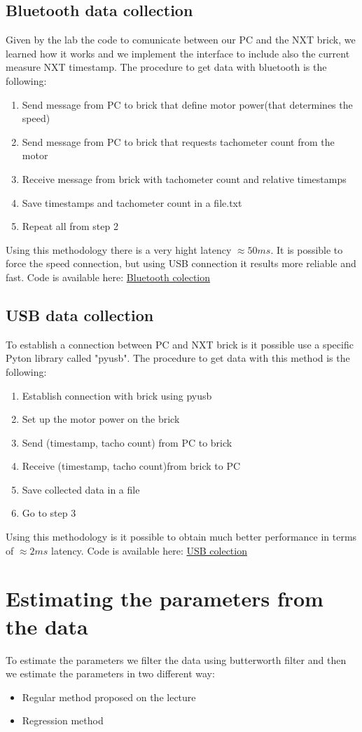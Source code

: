 \documentclass[a4paper,12pt,oneside]{article}
\begin{document}
\subsection{Bluetooth data collection}
Given by the lab the code to comunicate between our PC and the NXT brick, we learned how it works and we implement the interface to include also the current measure NXT timestamp. The procedure to get data with bluetooth is the following:
\begin{enumerate}
\item Send message from PC to brick that define motor power(that determines the speed)
\item Send message from PC to brick that requests tachometer count from the motor
\item Receive message from brick with tachometer count and relative timestamps
\item Save timestamps and tachometer count in a file.txt
\item Repeat all from step 2
\end{enumerate}
Using this methodology there is a very hight latency $\approx 50ms$. It is possible to force the speed connection, but using USB connection it results more reliable and fast.
Code is available here: \href{https://github.com/AliaksandrSiarohin/AppliedRobotics/brofist}{Bluetooth colection}
\subsection{USB data collection}
To establish a connection between PC and NXT brick is it possible use a specific Pyton library called "pyusb".
The procedure to get data with this method is the following:
\begin{enumerate}
\item Establish connection with brick using pyusb
\item Set up the motor power on the brick
\item Send (timestamp,  tacho count) from PC to brick
\item Receive (timestamp,  tacho count)from brick to PC
\item Save collected data in a file
\item Go to step 3
\end{enumerate}
Using this methodology is it possible to obtain much better performance in terms of $\approx 2ms$ latency. 
Code is available here: \href{https://github.com/AliaksandrSiarohin/AppliedRobotics/usb_collector}{USB colection}
\section {Estimating the parameters from the data}
To estimate the parameters we filter the data using butterworth filter and then we estimate the parameters in two different way:
\begin{itemize}
\item Regular method proposed on the lecture
\item Regression method
\end{itemize}
\end{document}
